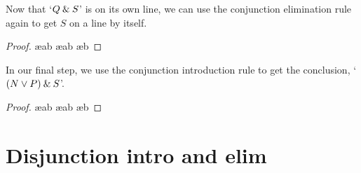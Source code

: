 \noindent Now that `$Q\mathbin{\&} S$' is on its own line, we can use the conjunction elimination rule again to get $S$ on a line by itself. 

\begin{proof}
	 \pr{}
	 \ae{ab}
	 \ae{ab}
	 \ae{b}
\end{proof}
In our final step, we use the conjunction introduction rule to get the conclusion, `$(N\vee P)\mathbin{\&} S$'.
\begin{proof}
	 \pr{}
	 \ae{ab}
	 \ae{ab}
	 \ae{b}
	 
\end{proof}
 

\section{Disjunction intro and elim}\label{s:disj-rule}


